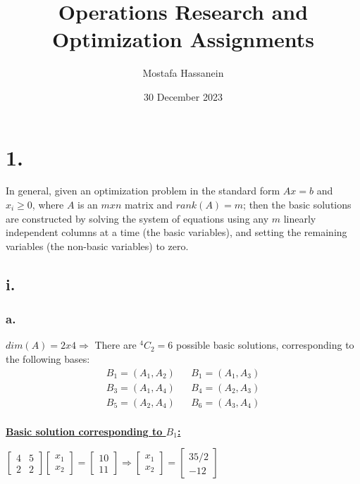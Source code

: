 \documentclass{article}
\author{Mostafa Hassanein}
\title{Operations Research and Optimization Assignments}
\date{30 December 2023}
\begin{document}
\maketitle

\newpage

\newcommand*\numcircledmod[1]{\raisebox{.5pt}{\textcircled{\raisebox{-.9pt} {#1}}}}

\newcommand*\numcircledtikz[1]{\tikz[baseline=(char.base)]{
            \node[shape=circle,draw,inner sep=1.2pt] (char) {#1};}} 


\section*{1.}

In general, given an optimization problem in the standard form $Ax=b$ and $x_i \geq 0$, where $A$ is an $mxn$ matrix and $rank(A)=m$; then the basic solutions are constructed by solving the system of equations using any $m$ linearly independent columns at a time (the basic variables), and setting the remaining variables (the non-basic variables) to zero.

\subsection*{i.}
\subsubsection*{a.}

$dim(A) = 2x4 \Rightarrow$ There are $^4C_2=6$ possible basic solutions, corresponding to the following bases:
\begin{align*}
  B_1 = (A_1, A_2) && B_1 = (A_1, A_3) \\
  B_3 = (A_1, A_4) && B_4 = (A_2, A_3) \\
  B_5 = (A_2, A_4) && B_6 = (A_3, A_4) \\
\end{align*}

\noindent
\textbf{\underline{Basic solution corresponding to $B_1$:}}

\noindent
\newline
$
\begin{bmatrix}
  4 & 5 \\
  2 & 2
\end{bmatrix}
\begin{bmatrix}
  x_1 \\
  x_2
\end{bmatrix}
=
\begin{bmatrix}
 10 \\
 11 
\end{bmatrix}
\Rightarrow
\begin{bmatrix}
  x_1 \\
  x_2
\end{bmatrix}
=
\begin{bmatrix}
  35/2 \\
  -12
\end{bmatrix}
$
\newline
\end{document}
